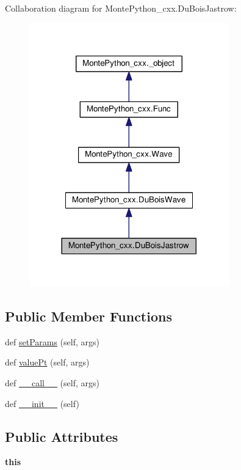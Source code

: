 Collaboration diagram for Monte\+Python\+\_\+cxx.\+Du\+Bois\+Jastrow\+:
\nopagebreak
\begin{figure}[H]
\begin{center}
\leavevmode
\includegraphics[width=245pt]{classMontePython__cxx_1_1DuBoisJastrow__coll__graph}
\end{center}
\end{figure}
\subsection*{Public Member Functions}
\begin{DoxyCompactItemize}
\item 
def \hyperlink{classMontePython__cxx_1_1DuBoisJastrow_a659649ff4b7e94df0de61f02000ca145}{set\+Params} (self, args)
\item 
def \hyperlink{classMontePython__cxx_1_1DuBoisJastrow_ab11797d6cc1f39dfe435a00813c84e2d}{value\+Pt} (self, args)
\item 
def \hyperlink{classMontePython__cxx_1_1DuBoisJastrow_a8427ec3cef4cf56875c3b905be82591c}{\+\_\+\+\_\+call\+\_\+\+\_\+} (self, args)
\item 
def \hyperlink{classMontePython__cxx_1_1DuBoisJastrow_ad3066d0cb1c1fb05b7981208b0bb2f61}{\+\_\+\+\_\+init\+\_\+\+\_\+} (self)
\end{DoxyCompactItemize}
\subsection*{Public Attributes}
\begin{DoxyCompactItemize}
\item 
\hypertarget{classMontePython__cxx_1_1DuBoisJastrow_a36f6bc926cef38dbfd68d9255dd5fbf4}{}{\bfseries this}\label{classMontePython__cxx_1_1DuBoisJastrow_a36f6bc926cef38dbfd68d9255dd5fbf4}

\end{DoxyCompactItemize}
